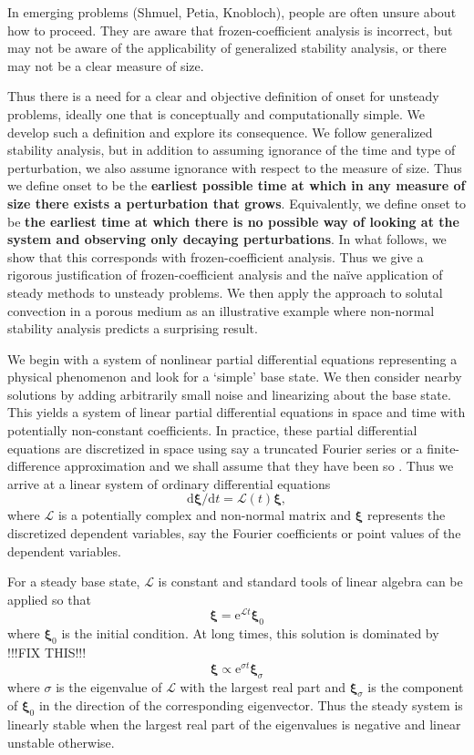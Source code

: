 \documentclass[letterpaper,prl,aps,reprint,superscriptaddress]{revtex4-1}
\newcommand{\cL}{\boldsymbol{\mathcal{L}}}
\newcommand{\prt}{\boldsymbol{\xi}}
\begin{document}
In emerging problems (Shmuel, Petia, Knobloch), people are often unsure about how to proceed.  They are aware that frozen-coefficient analysis is incorrect, but may not be aware of the applicability of generalized stability analysis, or there may not be a clear measure of size.

Thus there is a need for a clear and objective definition of onset for unsteady problems, ideally one that is conceptually and computationally simple.  We develop such a definition and explore its consequence.  We follow generalized stability analysis, but in addition to assuming ignorance of the time and type of perturbation, we also assume ignorance with respect to the measure of size.  Thus we define onset to be the {\bf earliest possible time at which in any measure of size there exists a perturbation that grows}.  Equivalently, we define onset to be {\bf the earliest time at which there is no possible way of looking at the system and observing only decaying perturbations}.  In what follows, we show that this corresponds with frozen-coefficient analysis.  Thus we give a rigorous justification of frozen-coefficient analysis and the na\"ive application of steady methods to unsteady problems.  We then apply the approach to solutal convection in a porous medium as an illustrative example where non-normal stability analysis predicts a surprising result.

We begin with a system of nonlinear partial differential equations representing a physical phenomenon and look for a `simple' base state.  We then consider nearby solutions by adding arbitrarily small noise and linearizing about the base state.  This yields a system of linear partial differential equations in space and time with potentially non-constant coefficients.  In practice, these partial differential equations are discretized in space using say a truncated Fourier series or a finite-difference approximation and we shall assume that they have been so \cite{FarrellIoannou}.  Thus we arrive at a linear system of ordinary differential equations
\[
{\text{d}\prt}/{\text{d} t} = \cL(t)\prt,
\]
where $\cL$ is a potentially complex and non-normal matrix and $\prt$ represents the discretized dependent variables, say the Fourier coefficients or point values of the dependent variables.  

For a steady base state, $\cL$ is constant and standard tools of linear algebra can be applied so that
\[
\prt = \text{e}^{\cL t}\prt_0
\]
where $\prt_0$ is the initial condition.  At long times, this solution is dominated by !!!FIX THIS!!!
\[
\prt \propto \text{e}^{\sigma t}\prt_\sigma
\]
where $\sigma$ is the eigenvalue of $\cL$ with the largest real part and $\prt_\sigma$ is the component of $\prt_0$ in the direction of the corresponding eigenvector.  Thus the steady system is linearly stable when the largest real part of the eigenvalues is negative and linear unstable otherwise.
\end{document}

